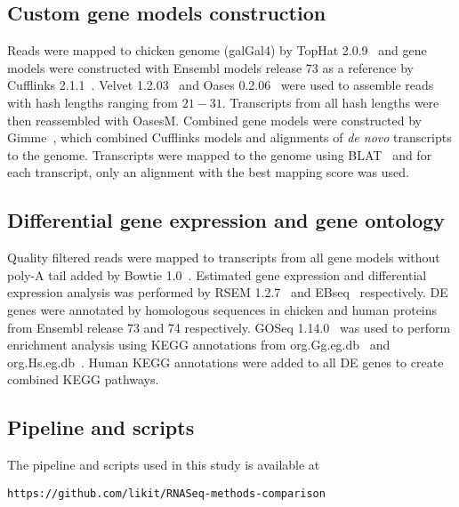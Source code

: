 \subsection{Custom gene models construction}

Reads were mapped to chicken genome (galGal4) by TopHat
2.0.9~\cite{Trapnell:2009dp} and gene models were
constructed with Ensembl models release 73 as a reference by
Cufflinks 2.1.1~\cite{Trapnell:2010kd}.  Velvet
1.2.03~\cite{Zerbino:2008vu} and Oases
0.2.06~\cite{Schulz:2012je} were used to assemble reads with
hash lengths ranging from $21-31$.  Transcripts from all
hash lengths were then reassembled with OasesM.  Combined
gene models were constructed by Gimme~\cite{gimme:Online},
which combined Cufflinks models and alignments of \textit{de
novo} transcripts to the genome.  Transcripts were mapped to
the genome using BLAT~\cite{Kent:2002tv} and for each
transcript, only an alignment with the best mapping score
was used.


\subsection{Differential gene expression and gene ontology}

Quality filtered reads were mapped to transcripts from all
gene models without poly-A tail added by Bowtie
1.0~\cite{langmead2009ultrafast}.  Estimated gene expression
and differential expression analysis was performed by RSEM
1.2.7~\cite{li2011rsem} and EBseq~\cite{leng2013ebseq}
respectively.  DE genes were annotated by homologous
sequences in chicken and human proteins from Ensembl release
73 and 74 respectively.  GOSeq 1.14.0~\cite{young2010method}
was used to perform enrichment analysis using KEGG
annotations from org.Gg.eg.db~\cite{Gg} and
org.Hs.eg.db~\cite{Hs}.  Human KEGG annotations were added
to all DE genes to create combined KEGG pathways.

\subsection{Pipeline and scripts}

The pipeline and scripts used in this study is available at

\texttt{https://github.com/likit/RNASeq-methods-comparison}
